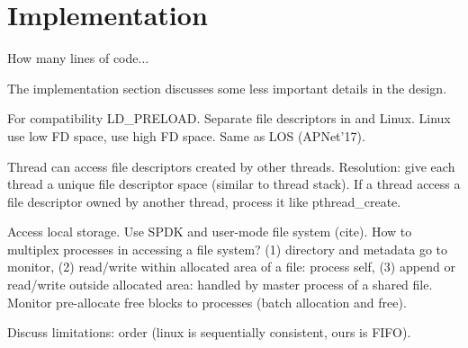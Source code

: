 \section{Implementation}
\label{sec:implementation}

How many lines of code...

The implementation section discusses some less important details in the design.


For compatibility
LD\_PRELOAD.
Separate file descriptors in \sys and Linux. Linux use low FD space, \sys use high FD space. Same as LOS (APNet'17).

Thread can access file descriptors created by other threads. Resolution: give each thread a unique file descriptor space (similar to thread stack). If a thread access a file descriptor owned by another thread, process it like pthread\_create.

Access local storage. Use SPDK and user-mode file system (cite). How to multiplex processes in accessing a file system? (1) directory and metadata go to monitor, (2) read/write within allocated area of a file: process self, (3) append or read/write outside allocated area: handled by master process of a shared file. Monitor pre-allocate free blocks to processes (batch allocation and free).

Discuss limitations: order (linux is sequentially consistent, ours is FIFO).